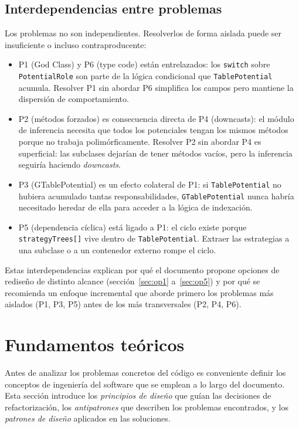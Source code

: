 \documentclass[11pt,a4paper]{article}
\newcommand{\code}[1]{\texttt{#1}}
\begin{document}
\subsection{Interdependencias entre problemas}

Los problemas no son independientes.  Resolverlos de forma aislada puede ser
insuficiente o incluso contraproducente:

\begin{itemize}
  \item P1 (God Class) y P6 (type code) están entrelazados: los \code{switch}
        sobre \code{PotentialRole} son parte de la lógica condicional que
        \code{TablePotential} acumula.  Resolver P1 sin abordar P6 simplifica
        los campos pero mantiene la dispersión de comportamiento.
  \item P2 (métodos forzados) es consecuencia directa de P4 (downcasts): el
        módulo de inferencia necesita que todos los potenciales tengan los
        mismos métodos porque no trabaja polimórficamente.  Resolver P2 sin
        abordar P4 es superficial: las subclases dejarían de tener métodos
        vacíos, pero la inferencia seguiría haciendo \emph{downcasts}.
  \item P3 (GTablePotential) es un efecto colateral de P1: si \code{TablePotential}
        no hubiera acumulado tantas responsabilidades, \code{GTablePotential}
        nunca habría necesitado heredar de ella para acceder a la lógica de
        indexación.
  \item P5 (dependencia cíclica) está ligado a P1: el ciclo existe porque
        \code{strategyTrees[]} vive dentro de \code{TablePotential}.  Extraer
        las estrategias a una subclase o a un contenedor externo rompe el ciclo.
\end{itemize}

Estas interdependencias explican por qué el documento propone opciones de
rediseño de distinto alcance (sección~\ref{sec:op1} a~\ref{sec:op5}) y por qué
se recomienda un enfoque incremental que aborde primero los problemas más
aislados (P1, P3, P5) antes de los más transversales (P2, P4, P6).

\section{Fundamentos teóricos}
\label{sec:fundamentos}

Antes de analizar los problemas concretos del código es conveniente definir los
conceptos de ingeniería del software que se emplean a lo largo del documento.
Esta sección introduce los \emph{principios de diseño} que guían las decisiones
de refactorización, los \emph{antipatrones} que describen los problemas
encontrados, y los \emph{patrones de diseño} aplicados en las soluciones.
\end{document}
